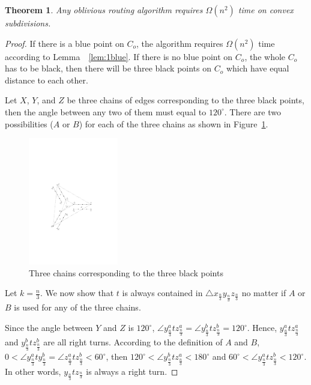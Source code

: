\documentclass [letterpaper] {patmorin}
\newtheorem{theorem}{Theorem}%
\begin{document}
\begin{theorem}
  \label{thm:quadratic}
  Any oblivious routing algorithm requires $\Omega (n^{2})$ time on convex subdivisions.
\end{theorem}

\begin{proof}
  If there is a blue point on $C_{o}$, the algorithm requires $\Omega (n^{2})$ time according to Lemma~~\ref{lem:1blue}. If there is no blue point on $C_{o}$, the whole $C_{o}$ has to be black, then there will be three black points on $C_{o}$ which have equal distance to each other.

  Let $X$, $Y$, and $Z$ be three chains of edges corresponding to the three black points, then the angle between any two of them must equal to $120^{\circ}$. There are two possibilities ($A$ or $B$) for each of the three chains as shown in 
Figure~\ref{fig:3black}.
\begin{figure}[ht]
  \centering
  \includegraphics[width=0.35\textwidth]{pics/3black.pdf}
  \caption{Three chains corresponding to the three black points}
  \label{fig:3black}
\end{figure}
Let $k = \frac{n}{3}$. We now show that $t$ is always contained in $\triangle x_{\frac{n}{3}}y_{\frac{n}{3}}z_{\frac{n}{3}}$ no matter if $A$ or $B$ is used for any of the three chains. 

Since the angle between $Y$ and $Z$ is $120^{\circ}$, $\angle y^{a}_{\frac{n}{3}}tz^{a}_{\frac{n}{3}} = \angle y^{b}_{\frac{n}{3}}tz^{b}_{\frac{n}{3}} = 120^{\circ}$. Hence, $y^{a}_{\frac{n}{3}}tz^{a}_{\frac{n}{3}}$ and $y^{b}_{\frac{n}{3}}tz^{b}_{\frac{n}{3}}$ are all right turns. According to the definition of $A$ and $B$, $0 < \angle y^{a}_{\frac{n}{3}}ty^{b}_{\frac{n}{3}} = \angle z^{a}_{\frac{n}{3}}tz^{b}_{\frac{n}{3}} < 60^{\circ}$, then $120^{\circ} < \angle y^{b}_{\frac{n}{3}}tz^{a}_{\frac{n}{3}} < 180^{\circ}$ and $60^{\circ} < \angle y^{a}_{\frac{n}{3}}tz^{b}_{\frac{n}{3}} < 120^{\circ}$. In other words, $y_{\frac{n}{3}}tz_{\frac{n}{3}}$ is always a right turn.


\end{proof}
\end{document}
